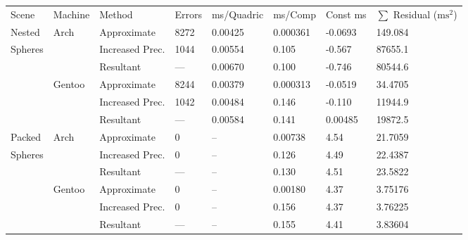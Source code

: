 \begin{tabular}{|l|l|ll|lll|l|}
\hline
Scene & Machine & Method & Errors & ms/Quadric & ms/Comp & Const ms & $\sum$ Residual ($\text{ms}^2$)\\
\hhline{|=|=|==|===|=|}
Nested & Arch & Approximate & 8272 & 0.00425 & \hphantom{-}0.000361 & -0.0693 & \hphantom{000}\hphantom{-}149.084\\
Spheres &  & Increased Prec. & 1044 & 0.00554 & \hphantom{-}0.105 & -0.567 & \hphantom{0}\hphantom{-}87655.1\\
 &  & Resultant & \hphantom{---}--- & 0.00670 & \hphantom{-}0.100 & -0.746 & \hphantom{0}\hphantom{-}80544.6\\
\hhline{|~|-|--|---|-|}
 & Gentoo & Approximate & 8244 & 0.00379 & \hphantom{-}0.000313 & -0.0519 & \hphantom{0000}\hphantom{-}34.4705\\
 &  & Increased Prec. & 1042 & 0.00484 & \hphantom{-}0.146 & -0.110 & \hphantom{0}\hphantom{-}11944.9\\
 &  & Resultant & \hphantom{---}--- & 0.00584 & \hphantom{-}0.141 & \hphantom{-}0.00485 & \hphantom{0}\hphantom{-}19872.5\\
\hhline{|-|-|--|---|-|}
Packed & Arch & Approximate & \hphantom{000}0 & -- & \hphantom{-}0.00738 & \hphantom{-}4.54 & \hphantom{0000}\hphantom{-}21.7059\\
Spheres &  & Increased Prec. & \hphantom{000}0 & -- & \hphantom{-}0.126 & \hphantom{-}4.49 & \hphantom{0000}\hphantom{-}22.4387\\
 &  & Resultant & \hphantom{---}--- & -- & \hphantom{-}0.130 & \hphantom{-}4.51 & \hphantom{0000}\hphantom{-}23.5822\\
\hhline{|~|-|--|---|-|}
 & Gentoo & Approximate & \hphantom{000}0 & -- & \hphantom{-}0.00180 & \hphantom{-}4.37 & \hphantom{00000}\hphantom{-}3.75176\\
 &  & Increased Prec. & \hphantom{000}0 & -- & \hphantom{-}0.156 & \hphantom{-}4.37 & \hphantom{00000}\hphantom{-}3.76225\\
 &  & Resultant & \hphantom{---}--- & -- & \hphantom{-}0.155 & \hphantom{-}4.41 & \hphantom{00000}\hphantom{-}3.83604\\
\hline
\end{tabular}
